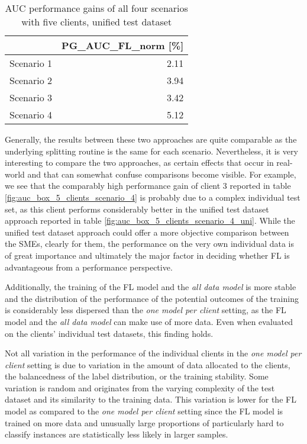 \begin{table}[h]
\centering
\caption{AUC performance gains of all four scenarios with five clients, unified test dataset}
\label{tab:auc_welfare_5_clients_all_scenarios_uni}
\begin{tabular}{lr}
\toprule
{} &  PG\_AUC\_FL\_norm [\%] \\
\midrule
Scenario 1 &                2.11 \\
Scenario 2 &                3.94 \\
Scenario 3 &                3.42 \\
Scenario 4 &                5.12 \\
\bottomrule
\end{tabular}
\end{table}
Generally, the results between these two approaches are quite comparable as the underlying splitting routine is the same for each scenario. Nevertheless, it is very interesting to compare the two approaches, as certain effects that occur in real-world and that can somewhat confuse comparisons become visible. For example, we see that the comparably high performance gain of client 3 reported in table \ref{fig:auc_box_5_clients_scenario_4} is probably due to a complex individual test set, as this client performs considerably better in the unified test dataset approach reported in table \ref{fig:auc_box_5_clients_scenario_4_uni}. While the unified test dataset approach could offer a more objective comparison between the SMEs, clearly for them, the performance on the very own individual data is of great importance and ultimately the major factor in deciding whether FL is advantageous from a performance perspective.

Additionally, the training of the FL model and the \emph{all data model} is more stable and the distribution of the performance of the potential outcomes of the training is considerably less dispersed than the \emph{one model per client} setting, as the FL model and the \emph{all data model} can make use of more data. Even when evaluated on the clients' individual test datasets, this finding holds.

Not all variation in the performance of the individual clients in the \emph{one model per client} setting is due to variation in the amount of data allocated to the clients, the balancedness of the label distribution, or the training stability. Some variation is random and originates from the varying complexity of the test dataset and its similarity to the training data. This variation is lower for the FL model as compared to the \emph{one model per client} setting since the FL model is trained on more data and unusually large proportions of particularly hard to classify instances are statistically less likely in larger samples.


